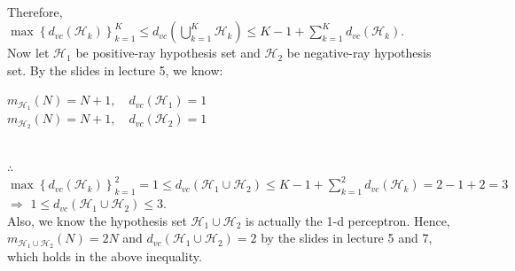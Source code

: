 \documentclass[a4paper,12pt]{article}
\begin{document}
\\
Therefore, $\max \left \{   d_{vc} (\mathcal{H}_{k})   \right \}_{k=1}^{K} \leq d_{vc}(\displaystyle \bigcup_{k=1}^{K}\mathcal{H}_{k} ) \leq K-1+ \displaystyle \sum_{k=1}^{K} d_{vc}(\mathcal{H}_{k})$.\\
Now let $\mathcal{H}_{1}$ be positive-ray hypothesis set and $\mathcal{H}_{2}$ be negative-ray hypothesis set. By the slides in lecture 5, we know:
\begin{minipage}[t]{0.9\linewidth}
$m_{\mathcal{H}_{1}}(N)=N+1, \quad d_{vc}(\mathcal{H}_{1})=1$ \\
$m_{\mathcal{H}_{2}}(N)=N+1, \quad d_{vc}(\mathcal{H}_{2})=1$
\end{minipage}
\\
$\therefore$ $\max \left \{   d_{vc} (\mathcal{H}_{k})   \right \}_{k=1}^{2}=1 \leq d_{vc}(\mathcal{H}_{1} \cup \mathcal{H}_{2} ) \leq K-1+ \displaystyle \sum_{k=1}^{2} d_{vc}(\mathcal{H}_{k})=2-1+2=3$\\
$\Rightarrow$ $1 \leq d_{vc}(\mathcal{H}_{1} \cup \mathcal{H}_{2} ) \leq 3$.\\
Also, we know the hypothesis set $\mathcal{H}_{1} \cup \mathcal{H}_{2}$ is actually the 1-d perceptron. Hence,          $m_{\mathcal{H}_{1} \cup \mathcal{H}_{2}}(N)=2N$   and $d_{vc}({\mathcal{H}_{1} \cup \mathcal{H}_{2}})=2$ by the slides in lecture 5 and 7, which holds in the above inequality.
\end{document}
